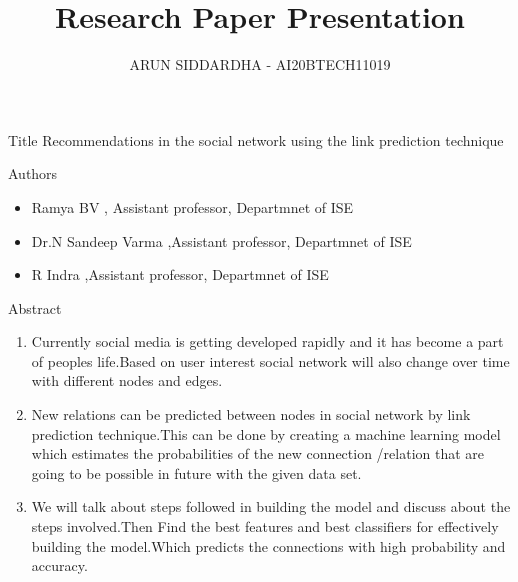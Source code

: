 \documentclass{beamer}
\title{Research Paper Presentation}
\author{ARUN SIDDARDHA - AI20BTECH11019}
\begin{document}
\begin{frame}
\titlepage
\end{frame}
\section{}
\begin{frame}
    \begin{block}{Title}
   Recommendations in the social network using the link prediction technique
    \end{block}
    \begin{block}{Authors}
    \begin{itemize}
        \item Ramya BV , Assistant professor, Departmnet of ISE
        \item Dr.N Sandeep Varma ,Assistant professor, Departmnet of ISE
        \item R Indra ,Assistant professor, Departmnet of ISE
    \end{itemize}
    \end{block}
\end{frame}
\begin{frame}
\begin{block}{Abstract}
\begin{enumerate}
    \item Currently social media is getting developed rapidly and it has become a part of peoples life.Based on user interest social network will also change over time with different nodes and edges.
    \item New relations can be predicted between nodes in social network by link prediction technique.This can be done by creating a machine learning model which estimates the probabilities of the new connection /relation that are going to be possible in future with the given data set.
    \item We will talk about steps followed in building the model and discuss about the steps involved.Then Find the best features and best classifiers for effectively building the model.Which predicts the connections with high probability and accuracy.
\end{enumerate}
\end{block}
\end{frame}
\end{document}
